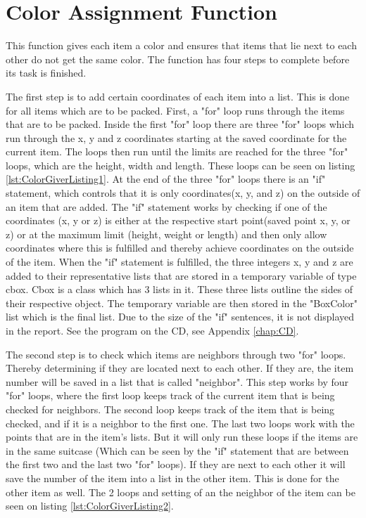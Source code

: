 \section{Color Assignment Function}
\label{sec:ColorGiver}
This function gives each item a color and ensures that items that lie next to each other do not get the same color. The function has four steps to complete before its task is finished.

The first step is to add certain coordinates of each item into a list. This is done for all items which are to be packed. First, a "for" loop runs through the items that are to be packed. Inside the first "for" loop there are three "for" loops which run through the x, y and z coordinates starting at the saved coordinate for the current item. The loops then run until the limits are reached for the three "for" loops, which are the height, width and length. These loops can be seen on listing \ref{lst:ColorGiverListing1}. At the end of the three "for" loops there is an "if" statement, which controls that it is only coordinates(x, y, and z) on the outside of an item that are added. The "if" statement works by checking if one of the coordinates (x, y or z) is either at the respective start point(saved point x, y, or z) or at the maximum limit (height, weight or length) and then only allow coordinates where this is fulfilled and thereby achieve coordinates on the outside of the item.
When the "if" statement is fulfilled, the three integers x, y and z are added to their representative lists that are stored in a temporary variable of type cbox. Cbox is a class which has 3 lists in it. These three lists outline the sides of their respective object. The temporary variable are then stored in the "BoxColor" list which is the final list. Due to the size of the "if" sentences, it is not displayed in the report. See the program on the CD, see Appendix \ref{chap:CD}.

The second step is to check which items are neighbors through two "for" loops. Thereby determining if they are located next to each other. If they are, the item number will be saved in a list that is called "neighbor". This step works by four "for" loops, where the first loop keeps track of the current item that is being checked for neighbors. The second loop keeps track of the item that is being checked, and if it is a neighbor to the first one. The last two loops work with the points that are in the item's lists. But it will only run these loops if the items are in the same suitcase (Which can be seen by the "if" statement that are between the first two and the last two "for" loops). If they are next to each other it will save the number of the item into a list in the other item. This is done for the other item as well. The 2 loops and setting of an the neighbor of the item can be seen on listing \ref{lst:ColorGiverListing2}.

